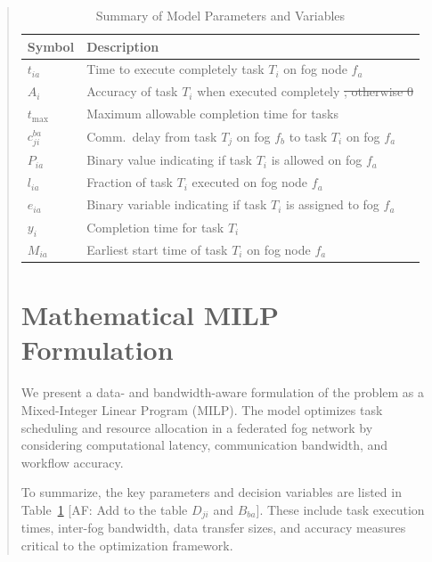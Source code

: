 \documentclass[conference]{IEEEtran}
\newcommand{\anninsert}[2]{{\color{#1}#2}}
\newcommand{\anncomment}[3]{{\color{#1}[#2: #3]}}
\newcommand{\anninsert}[2]{#2}
\newcommand{\anncomment}[3]{}
\newcommand{\AF}[1]{\anncomment{violet}{AF}{#1}}
\newcommand{\af}[1]{\anninsert{violet}{#1}}
\begin{document}
\begin{abstract}
\begin{table}[t!]
    \centering
    \caption{Summary of Model Parameters and Variables}
    \begin{tabular}{|l|l|}
        \hline
        \textbf{Symbol} & \textbf{Description} \\
        \hline
        \( t_{ia} \) & Time to execute completely task \( T_i \) on fog node \( f_a \) \\ \hline
        \( A_i \) & Accuracy of task \( T_i \) when executed completely
        \af{\sout{; otherwise 0}} \\ \hline
        \( t_{\max} \) & Maximum allowable completion time for tasks \\ \hline
        \( c_{ji}^{ba} \) & Comm.~delay from task \( T_j \) on fog \( f_b \) to task \( T_i \) on fog \( f_a \) \\ \hline
        \( P_{ia} \) & Binary value indicating if task \( T_i \) is allowed on fog \( f_a \) \\ \hline \hline
        \( l_{ia}\) & Fraction of task \( T_i \) executed on fog node \( f_a \) \\ \hline
        \( e_{ia} \) & Binary variable indicating if task \( T_i \) is assigned to fog \( f_a \) \\ \hline
        \( y_i \) & Completion time for task \( T_i \) \\ \hline
        \( M_{ia} \) & Earliest start time of task \( T_i \) on fog node \( f_a \) \\ \hline
    \end{tabular}
    \label{tab:variables}
\end{table}

\section{Mathematical MILP Formulation}
\label{sec:MILP}

We present a data- and bandwidth-aware formulation of the problem as a Mixed-Integer Linear Program (MILP). The model optimizes task scheduling and resource allocation in a federated fog network by considering computational latency, communication bandwidth, and workflow accuracy. 

To summarize, the key parameters and decision variables are listed in Table~\ref{tab:variables} \AF{Add to the table $D_{ji}$ and $B_{ba}$}. These include task execution times, inter-fog bandwidth, data transfer sizes, and accuracy measures critical to the optimization framework.


\end{abstract}
\end{document}
